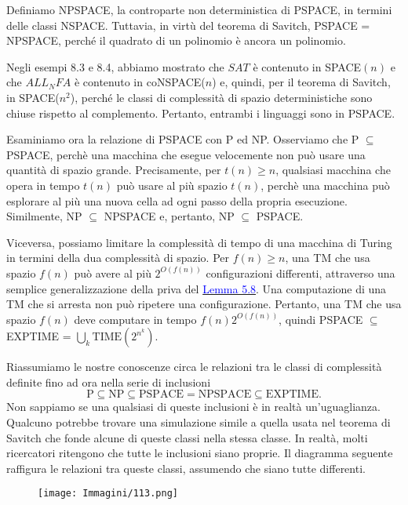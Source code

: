 \documentclass{article}
\begin{document}
Definiamo NPSPACE, la controparte non deterministica di PSPACE, in termini delle classi NSPACE.
Tuttavia, in virtù del teorema di Savitch, PSPACE = NPSPACE, perché il quadrato di un polinomio è ancora un polinomio.

Negli esempi 8.3 e 8.4, abbiamo mostrato che $SAT$ è contenuto in SPACE$(n)$ e che $ALL_NFA$ è contenuto in coNSPACE($n$) e, quindi, per il teorema di Savitch, in SPACE($n^2$), perché le classi di complessità di spazio deterministiche sono chiuse rispetto al complemento.
Pertanto, entrambi i linguaggi sono in PSPACE.

Esaminiamo ora la relazione di PSPACE con P ed NP.
Osserviamo che P $\subseteq$ PSPACE, perchè una macchina che esegue velocemente non può usare una quantità di spazio grande.
Precisamente, per $t(n) \geq n$, qualsiasi macchina che opera in tempo $t(n)$ può usare al più spazio $t(n)$, perchè una macchina può esplorare al più una nuova cella ad ogni passo della propria esecuzione.
Similmente, NP $\subseteq$ NPSPACE e, pertanto, NP $\subseteq$ PSPACE.

Viceversa, possiamo limitare la complessità di tempo di una macchina di Turing in termini della dua complessità di spazio.
Per $f(n) \geq n$, una TM che usa spazio $f(n)$ può avere al più $2^{O(f(n))}$ configurazioni differenti, attraverso una semplice generalizzazione della priva del \hyperref[lemma-5.8]{\textcolor{blue}{Lemma 5.8}}.
Una computazione di una TM che si arresta non può ripetere una configurazione.
Pertanto, una TM che usa spazio $f(n)$ deve computare in tempo $f(n)2^{O(f(n))}$, quindi PSPACE $\subseteq$ EXPTIME = $\bigcup_{k} \text{TIME}(2^{n^k})$.

Riassumiamo le nostre conoscenze circa le relazioni tra le classi di complessità definite fino ad ora nella serie di inclusioni
\[
\text{P} \subseteq \text{NP} \subseteq \text{PSPACE} = \text{NPSPACE} \subseteq \text{EXPTIME}.
\]
Non sappiamo se una qualsiasi di queste inclusioni è in realtà un'uguaglianza.
Qualcuno potrebbe trovare una simulazione simile a quella usata nel teorema di Savitch che fonde alcune di queste classi nella stessa classe.
In realtà, molti ricercatori ritengono che tutte le inclusioni siano proprie.
Il diagramma seguente raffigura le relazioni tra queste classi, assumendo che siano tutte differenti.

\begin{figure}[H]
    \centering
    \texttt{[image: Immagini/113.png]}
    \label{fig:relazioni-classi-complessita}
\end{figure}
\end{document}
